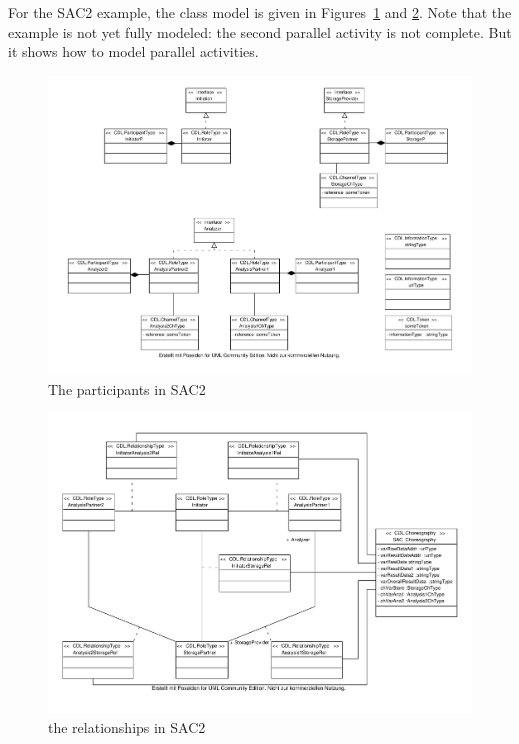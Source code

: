 \documentclass[pdftex]{scrartcl}
\begin{document}
For the SAC2 example, the class model is given in
Figures~\ref{fig:SAC2-participants} and \ref{fig:SAC2-relationships}.
Note that the example is not yet fully modeled: the second parallel
activity is not complete. But it shows how to model parallel
activities. 

\begin{figure}
  \centering
  \includegraphics[scale=0.85,angle=90]{SAC2-participants.pdf}
  \caption{The participants in SAC2}
  \label{fig:SAC2-participants}
\end{figure}

\begin{figure}
  \centering
  \includegraphics[scale=0.85,angle=90]{SAC2-relationships.pdf}
  \caption{the relationships in SAC2}
  \label{fig:SAC2-relationships}
\end{figure}
\end{document}
